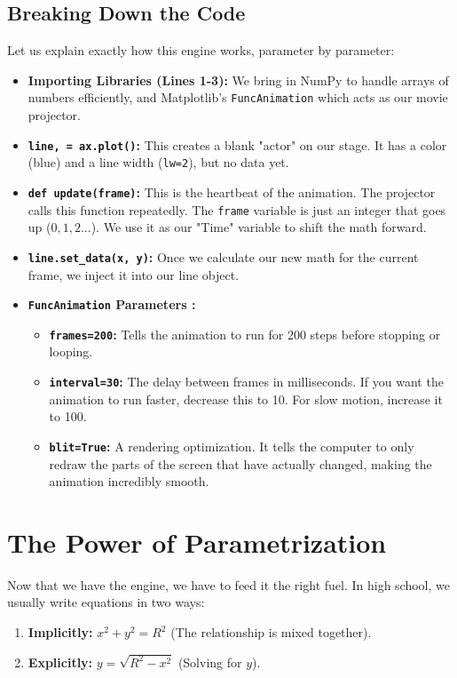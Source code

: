\documentclass[12pt, a4paper]{report}
\begin{document}
\subsection{Breaking Down the Code}
Let us explain exactly how this engine works, parameter by parameter:
\begin{itemize}
    \item \textbf{Importing Libraries (Lines 1-3):} We bring in NumPy to handle arrays of numbers efficiently, and Matplotlib's \texttt{FuncAnimation} which acts as our movie projector.
    \item \textbf{\texttt{line, = ax.plot()}:} This creates a blank "actor" on our stage. It has a color (blue) and a line width (\texttt{lw=2}), but no data yet.
    \item \textbf{\texttt{def update(frame)}:} This is the heartbeat of the animation. The projector calls this function repeatedly. The \texttt{frame} variable is just an integer that goes up ($0, 1, 2...$). We use it as our "Time" variable to shift the math forward.
    \item \textbf{\texttt{line.set\_data(x, y)}:} Once we calculate our new math for the current frame, we inject it into our line object.
    \item \textbf{\texttt{FuncAnimation} Parameters \cite{matplotlib_docs}:}
    \begin{itemize}
        \item \textbf{\texttt{frames=200}:} Tells the animation to run for 200 steps before stopping or looping.
        \item \textbf{\texttt{interval=30}:} The delay between frames in milliseconds. If you want the animation to run faster, decrease this to 10. For slow motion, increase it to 100.
        \item \textbf{\texttt{blit=True}:} A rendering optimization. It tells the computer to only redraw the parts of the screen that have actually changed, making the animation incredibly smooth.
    \end{itemize}
\end{itemize}

\section{The Power of Parametrization}

Now that we have the engine, we have to feed it the right fuel. In high school, we usually write equations in two ways:
\begin{enumerate}
    \item \textbf{Implicitly:} $x^2 + y^2 = R^2$ (The relationship is mixed together).
    \item \textbf{Explicitly:} $y = \sqrt{R^2 - x^2}$ (Solving for $y$).
\end{enumerate}
\end{document}
